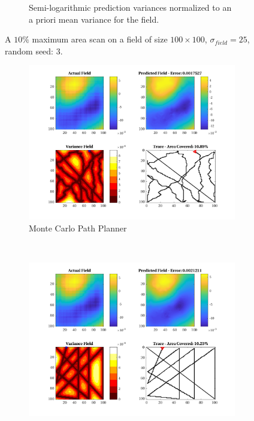 \begin{figure}[htb!]
\begin{subfigure}[t]{0.65\textwidth}
        \captionsetup{skip=0.20\baselineskip,size=footnotesize}
        \caption{Semi-logarithmic prediction variances normalized to an a priori mean variance for the field.}
        \label{fig:prederrs_sigma25_p10_s3}
    \end{subfigure}
    \captionsetup{skip=0.20\baselineskip}
    \caption{A $10\%$ maximum area scan on a field of size $100 \times 100$, $\sigma_{field} = 25$, random seed: 3.}
    \label{fig:sigma25_p10_s3}
\end{figure}

\begin{figure}[htb!]
    \centering
    \begin{subfigure}[t]{0.5\textwidth}
        \centering
        \includegraphics[width=\linewidth]{figures/hbresults/mc_10p_100x100_sf_25_seed_3.png}
        \captionsetup{skip=0.10\baselineskip,size=footnotesize}
        \caption{Monte Carlo Path Planner}
    \end{subfigure}%
    ~ 
    \begin{subfigure}[t]{0.5\textwidth}
        \centering
        \includegraphics[width=\linewidth]{figures/hbresults/nhv_10p_100x100_sf_25_seed_3.png}

\end{subfigure}
\end{figure}
